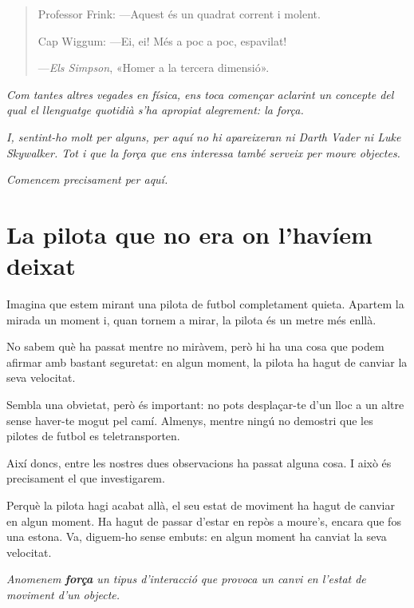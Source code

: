 
\begin{quote}
Professor Frink: —Aquest és un quadrat corrent i molent.

Cap Wiggum: —Ei, ei! Més a poc a poc, espavilat!

\hfill —\textit{Els Simpson}, «Homer a la tercera dimensió».
\end{quote}

\textit{
Com tantes altres vegades en física, ens toca començar aclarint un concepte del qual el llenguatge quotidià s'ha apropiat alegrement: la força.
}

\textit{
I, sentint-ho molt per alguns, per aquí no hi apareixeran ni Darth Vader ni Luke Skywalker. Tot i que la força que ens interessa també serveix per moure objectes.
}

\textit{
Comencem precisament per aquí.
}

\section{La pilota que no era on l'havíem deixat}

Imagina que estem mirant una pilota de futbol completament quieta. Apartem la mirada un moment i, quan tornem a mirar, la pilota és un metre més enllà.

No sabem què ha passat mentre no miràvem, però hi ha una cosa que podem afirmar amb bastant seguretat: en algun moment, la pilota ha hagut de canviar la seva velocitat.

Sembla una obvietat, però és important: no pots desplaçar-te d'un lloc a un altre sense haver-te mogut pel camí. Almenys, mentre ningú no demostri que les pilotes de futbol es teletransporten.

Així doncs, entre les nostres dues observacions ha passat alguna cosa. I això és precisament el que investigarem.

Perquè la pilota hagi acabat allà, el seu estat de moviment ha hagut de canviar en algun moment. Ha hagut de passar d'estar en repòs a moure's, encara que fos una estona. Va, diguem-ho sense embuts: en algun moment ha canviat la seva velocitat.

\textit{Anomenem \textbf{força} un tipus d'interacció que provoca un canvi en l'estat de moviment d'un objecte.}

